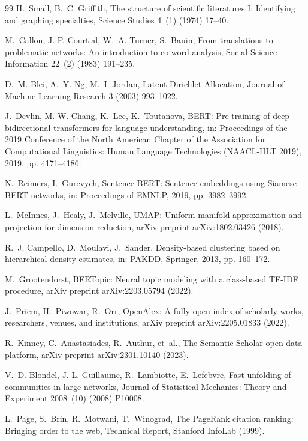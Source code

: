 \documentclass[preprint,12pt]{elsarticle}
\begin{document}
\begin{thebibliography}{99}
H.~Small, B.~C. Griffith, The structure of scientific literatures I: Identifying and graphing specialties, Science Studies 4~(1) (1974) 17--40.

M.~Callon, J.-P. Courtial, W.~A. Turner, S.~Bauin, From translations to problematic networks: An introduction to co-word analysis, Social Science Information 22~(2) (1983) 191--235.

D.~M. Blei, A.~Y. Ng, M.~I. Jordan, Latent Dirichlet Allocation, Journal of Machine Learning Research 3 (2003) 993--1022.

J.~Devlin, M.-W. Chang, K.~Lee, K.~Toutanova, BERT: Pre-training of deep bidirectional transformers for language understanding, in: Proceedings of the 2019 Conference of the North American Chapter of the Association for Computational Linguistics: Human Language Technologies (NAACL-HLT 2019), 2019, pp. 4171--4186.

N.~Reimers, I.~Gurevych, Sentence-BERT: Sentence embeddings using Siamese BERT-networks, in: Proceedings of EMNLP, 2019, pp. 3982--3992.

L.~McInnes, J.~Healy, J.~Melville, UMAP: Uniform manifold approximation and projection for dimension reduction, arXiv preprint arXiv:1802.03426 (2018).

R.~J. Campello, D.~Moulavi, J.~Sander, Density-based clustering based on hierarchical density estimates, in: PAKDD, Springer, 2013, pp. 160--172.

M.~Grootendorst, BERTopic: Neural topic modeling with a class-based TF-IDF procedure, arXiv preprint arXiv:2203.05794 (2022).

J.~Priem, H.~Piwowar, R.~Orr, OpenAlex: A fully-open index of scholarly works, researchers, venues, and institutions, arXiv preprint arXiv:2205.01833 (2022).

R.~Kinney, C.~Anastasiades, R.~Authur, et~al., The Semantic Scholar open data platform, arXiv preprint arXiv:2301.10140 (2023).

V.~D. Blondel, J.-L. Guillaume, R.~Lambiotte, E.~Lefebvre, Fast unfolding of communities in large networks, Journal of Statistical Mechanics: Theory and Experiment 2008~(10) (2008) P10008.

L.~Page, S.~Brin, R.~Motwani, T.~Winograd, The PageRank citation ranking: Bringing order to the web, Technical Report, Stanford InfoLab (1999).


\end{thebibliography}
\end{document}
